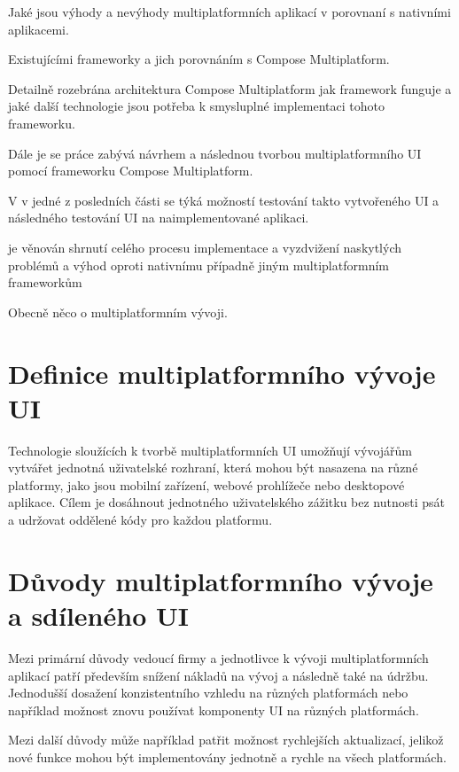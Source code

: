 




Jaké jsou výhody a nevýhody multiplatformních aplikací  v porovnaní s nativními aplikacemi.

Existujícími frameworky a jich porovnáním s Compose Multiplatform.

Detailně rozebrána architektura Compose Multiplatform jak framework funguje a jaké další technologie jsou potřeba k smysluplné implementaci tohoto
frameworku.

Dále je se práce zabývá návrhem a následnou tvorbou multiplatformního UI pomocí frameworku Compose Multiplatform.

V v jedné z posledních části se týká možností testování takto vytvořeného UI a následného testování UI na naimplementované aplikaci.

je věnován shrnutí celého procesu implementace a vyzdvižení naskytlých problémů a výhod oproti nativnímu případně jiným multiplatformním frameworkům



Obecně něco o multiplatformním vývoji.

\section{Definice multiplatformního vývoje UI}

Technologie sloužících k tvorbě multiplatformních UI umožňují vývojářům vytvářet jednotná uživatelské rozhraní, 
která mohou být nasazena na různé platformy, jako jsou mobilní zařízení, webové prohlížeče nebo desktopové aplikace. 
Cílem je dosáhnout jednotného uživatelského zážitku bez nutnosti psát a udržovat oddělené kódy pro každou platformu.


\section{Důvody multiplatformního vývoje a sdíleného UI}

Mezi primární důvody vedoucí firmy a jednotlivce k vývoji multiplatformních aplikací patří především
snížení nákladů na vývoj a následně také na údržbu. Jednodušší dosažení konzistentního vzhledu
na různých platformách nebo například možnost znovu používat komponenty UI na různých platformách.

Mezi další důvody může například patřit možnost rychlejších aktualizací, jelikož nové funkce mohou být 
implementovány jednotně a rychle na všech platformách. 

